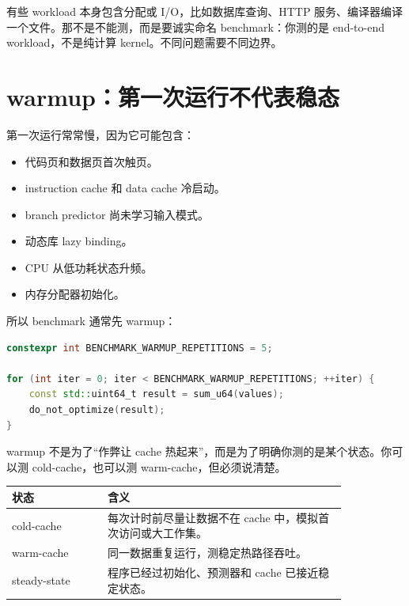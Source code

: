\begin{deepdive}
有些 workload 本身包含分配或 I/O，比如数据库查询、HTTP 服务、编译器编译一个文件。那不是不能测，而是要诚实命名 benchmark：你测的是 end-to-end workload，不是纯计算 kernel。不同问题需要不同边界。
\end{deepdive}

\section{warmup：第一次运行不代表稳态}

第一次运行常常慢，因为它可能包含：

\begin{itemize}
  \item 代码页和数据页首次触页。
  \item instruction cache 和 data cache 冷启动。
  \item branch predictor 尚未学习输入模式。
  \item 动态库 lazy binding。
  \item CPU 从低功耗状态升频。
  \item 内存分配器初始化。
\end{itemize}

所以 benchmark 通常先 warmup：

\begin{lstlisting}[language=C++]
constexpr int BENCHMARK_WARMUP_REPETITIONS = 5;

for (int iter = 0; iter < BENCHMARK_WARMUP_REPETITIONS; ++iter) {
    const std::uint64_t result = sum_u64(values);
    do_not_optimize(result);
}
\end{lstlisting}

warmup 不是为了“作弊让 cache 热起来”，而是为了明确你测的是某个状态。你可以测 cold-cache，也可以测 warm-cache，但必须说清楚。

\begin{center}
\begin{tabular}{p{0.24\linewidth}p{0.60\linewidth}}
\toprule
状态 & 含义 \\
\midrule
cold-cache & 每次计时前尽量让数据不在 cache 中，模拟首次访问或大工作集。 \\
warm-cache & 同一数据重复运行，测稳定热路径吞吐。 \\
steady-state & 程序已经过初始化、预测器和 cache 已接近稳定状态。 \\
\bottomrule
\end{tabular}
\end{center}

